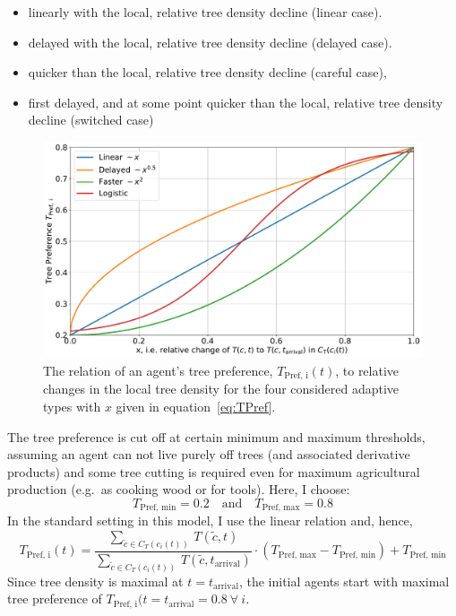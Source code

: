 \begin{itemize}
	\item linearly with the local, relative tree density decline (linear case).  
	\item delayed with the local, relative tree density decline (delayed case).
	\item quicker than the local, relative tree density decline (careful case),
	\item first delayed, and at some point quicker than the local, relative tree density decline (switched case) 
\end{itemize}
\begin{figure}
	\centering
	\includegraphics[width=\textwidth]{images/TPref}
	\caption{The relation of an agent's tree preference, $T_\text{Pref, i}(t)$, to relative changes in the local tree density for the four considered adaptive types with $x$ given in equation~\ref{eq:TPref}.}
	\label{fig:TPref_T}
\end{figure}
The tree preference is cut off at certain minimum and maximum thresholds, assuming an agent can not live purely off trees (and associated derivative products) and some tree cutting is required even for maximum agricultural production (e.g.\ as cooking wood or for tools). 
Here, I choose: 
\begin{equation}
T_\text{Pref, min} = 0.2 \quad \text{and} \quad T_\text{Pref, max} = 0.8
\end{equation} 
In the standard setting in this model, I use the linear relation and, hence, 
\begin{equation}
	T_\text{Pref, i}(t) =  \frac{\sum_{\tilde{c} \in C_{T}(c_i(t)) } \, T(\tilde{c}, t)}{\sum_{\tilde{c} \in C_{T}(c_i(t))} \, T(\tilde{c}, t_\text{arrival}) } \cdot (T_\text{Pref, max}-T_\text{Pref, min}) + T_\text{Pref, min}
\end{equation}
Since tree density is maximal at $t=t_\text{arrival}$, the initial agents start with maximal tree preference of $T_\text{Pref, i}(t=t_\text{arrival} = 0.8 \  \forall \ i$.


